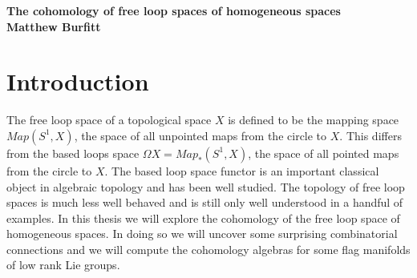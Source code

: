 \documentclass{article}
\theoremstyle{plain}
\theoremstyle{definition}
\numberwithin{thm}{section}
\begin{document}
\begin{center}
	{\huge \bf The cohomology of free loop spaces of homogeneous spaces} \\
	\vspace{1.5cm}
	{\bf Matthew Burfitt}
	\vspace{2cm}
\end{center}

\begin{abstract}
	The free loops space $\Lambda X$ of a space $X$ has become an important object of study particularly in the case when $X$ is a manifold.
	The study of free loop spaces is motivated in particular by two main examples.
	The first is their relation to geometrically distinct periodic geodesics on a manifold, originally studied by Gromoll and Meyer in $1969$.
	More recently the study of string topology and in particular the Chas-Sullivan loop product has been an active area of research. 
	
	A complete flag manifold is the quotient of a Lie group by its maximal torus and is one of the nicer examples of a homogeneous space.
	
	Both the cohomology and Chas-Sullivan product structure are understood for spaces $S^n$, $\mathbb{C}P^n$ and most simple Lie groups.
	Hence studying the topology of the free loops space on homogeneous space is a natural next step.
	
	In the thesis we compute the differentials in the integral Leray-Serre spectral sequence associated
	to the free loops space fibrations in the cases of $SU(n+1)/T^n$ and $Sp(n)/T^n$.
	Study in detail the structure of the third page of the spectral sequence in the case of $SU(n)$ and give the module structure of
	$H^*(\Lambda(SU(3)/T^2);\mathbb{Z})$ and $H^*(\Lambda(Sp(2)/T^2);\mathbb{Z})$.
\end{abstract}

\newpage
\tableofcontents

\newpage
\section{Introduction}
		
			The free loop space of a topological space $X$ is defined to be the mapping space $Map(S^1,X)$, the space of all unpointed maps from the circle to $X$.
			This differs from the based loops space $\Omega X=Map_*(S^1,X)$, the space of all pointed maps from the circle to $X$.
			The based loop space functor is an important classical object in algebraic topology and has been well studied.
			The topology of free loop spaces is much less well behaved and is still only well understood in a handful of examples.
			In this thesis we will explore the cohomology of the free loop space of homogeneous spaces.
			In doing so we will uncover some surprising combinatorial connections and we will compute the cohomology algebras for some flag manifolds of low rank Lie groups.
		
\end{document}

